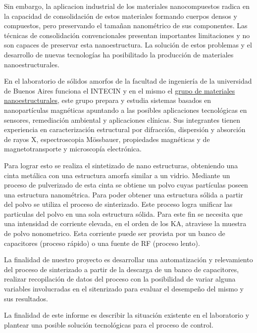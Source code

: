 \documentclass[12pt]{article}
\begin{document}
 Sin embargo, la aplicacion industrial de los materiales nanocompuestos radica en la capacidad de consolidación de estos materiales
 formando cuerpos densos y compuestos, pero preservando el tamañan nanométrico de sus componentes. Las técnicas de consolidación convencionales
 presentan importantes limitaciones y no son capaces de preservar esta nanoestructura. 
 La solución de estos problemas y el desarrollo de nuevas tecnologías ha posibilitado la producción de materiales nanoestructurales.

 En el laboratorio de sólidos amorfos de la facultad de ingeniería de la universidad de Buenos Aires funciona el 
 INTECIN y en el mismo el \href{''http://intecin.fi.uba.ar/grupos.php?grupo=12''}{grupo de materiales nanoestructurales}, este grupo prepara y
 estudia sistemas basados en nanopartículas magnéticas apuntando a las posibles aplicaciones tecnológicas
 en sensores, remediación ambiental y aplicaciones clínicas. Sus integrantes tienen experiencia en caracterización estructural por difracción, dispersión y absorción
 de rayos X, espectroscopia Mössbauer, propiedades magnéticas y de magnetotransporte y microscopía electrónica.\newline
  
 Para lograr esto se realiza el sintetizado de nano estructuras, obteniendo una cinta metálica con una estructura amorfa similar 
 a un vidrio. Mediante un proceso de
 pulverizado de esta cinta se obtiene un polvo cuyas partículas poseen una estructura nanométrica.
 Para poder obtener una estructura sólida a partir del polvo se utiliza el proceso de sinterizado. Este proceso
 logra unificar las particulas del polvo en una sola estructura sólida. Para este fin se necesita que una intensidad de corriente
 elevada, en el orden de los KA, atraviese la muestra de polvo nonometrico. Esta corriente puede ser provista por un banco de 
 capacitores (proceso rápido) o una fuente de RF (proceso lento).\newline

 La finalidad de nuestro proyecto es desarrollar una automatización y relevamiento del proceso de sinterizado a partir de la 
 descarga de un banco de capacitores, realizar recopilación de datos del proceso con la posibilidad de variar alguna variables
 involucradas en el sitenrizado para evaluar el desempeño del mismo y sus resultados.

 La finalidad de este informe es describir la situación existente en el laboratorio y plantear una posible solución tecnológicas 
 para el proceso de control.
\end{document}

